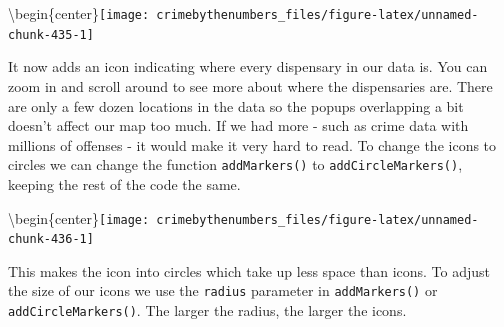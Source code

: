 \documentclass[
]{krantz}
\makeatletter
\newenvironment{Shaded}{\begin{snugshade}}{\end{snugshade}}
\newcommand{\AttributeTok}[1]{\textcolor[rgb]{0.61,0.61,0.61}{#1}}
\newcommand{\DecValTok}[1]{\textcolor[rgb]{0.06,0.06,0.06}{#1}}
\newcommand{\FunctionTok}[1]{\textcolor[rgb]{0,0,0}{#1}}
\newcommand{\NormalTok}[1]{#1}
\newcommand{\SpecialCharTok}[1]{\textcolor[rgb]{0,0,0}{#1}}
\newcommand{\StringTok}[1]{\textcolor[rgb]{0.5,0.5,0.5}{#1}}
\newenvironment{kframe}{%
\medskip{}
\setlength{\fboxsep}{.8em}
 \def\at@end@of@kframe{}%
 \ifinner\ifhmode%
  \def\at@end@of@kframe{\end{minipage}}%
  \begin{minipage}{\columnwidth}%
 \fi\fi%
 \def\FrameCommand##1{\hskip\@totalleftmargin \hskip-\fboxsep
 \colorbox{shadecolor}{##1}\hskip-\fboxsep
     \hskip-\linewidth \hskip-\@totalleftmargin \hskip\columnwidth}%
 \MakeFramed {\advance\hsize-\width
   \@totalleftmargin\z@ \linewidth\hsize
   \@setminipage}}%
 {\par\unskip\endMakeFramed%
 \at@end@of@kframe}
\renewenvironment{Shaded}{\begin{kframe}}{\end{kframe}}
\makeatother
\begin{document}
\textbackslash begin\{center\}\texttt{[image: crimebythenumbers\_files/figure-latex/unnamed-chunk-435-1]}

It now adds an icon indicating where every dispensary in our data is. You can zoom in and scroll around to see more about where the dispensaries are. There are only a few dozen locations in the data so the popups overlapping a bit doesn't affect our map too much. If we had more - such as crime data with millions of offenses - it would make it very hard to read. To change the icons to circles we can change the function \texttt{addMarkers()} to \texttt{addCircleMarkers()}, keeping the rest of the code the same.

\begin{Shaded}
\end{Shaded}

\textbackslash begin\{center\}\texttt{[image: crimebythenumbers\_files/figure-latex/unnamed-chunk-436-1]}

This makes the icon into circles which take up less space than icons. To adjust the size of our icons we use the \texttt{radius} parameter in \texttt{addMarkers()} or \texttt{addCircleMarkers()}. The larger the radius, the larger the icons.

\begin{Shaded}
\end{Shaded}
\end{document}
